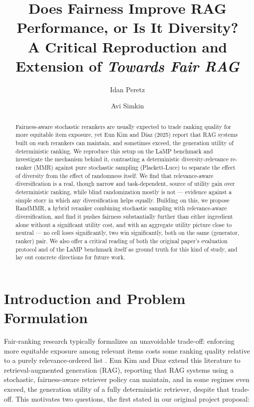 \documentclass[10pt,twocolumn]{article}
\title{\vspace{-1.2em}Does Fairness Improve RAG Performance, or Is It Diversity?\\
\large A Critical Reproduction and Extension of \emph{Towards Fair RAG}\vspace{-0.3em}}
\author[1]{Idan Peretz}
\author[1]{Avi Simkin}
\affil[1]{\normalsize \{308560150, 312485816\}}
\date{}
\begin{document}
\maketitle
\vspace{-2.2em}

\begin{abstract}
\noindent
Fairness-aware stochastic rerankers are usually expected to trade ranking quality for
more equitable item exposure, yet Eun Kim and Diaz (2025) report that RAG systems
built on such rerankers can maintain, and sometimes exceed, the generation utility of
deterministic ranking. We reproduce this setup on the LaMP benchmark and investigate
the mechanism behind it, contrasting a deterministic diversity-relevance re-ranker
(MMR) against pure stochastic sampling (Plackett-Luce) to separate the effect of
diversity from the effect of randomness itself. We find that relevance-aware
diversification is a real, though narrow and task-dependent, source of utility gain
over deterministic ranking, while blind randomization mostly is not --- evidence
against a simple story in which any diversification helps equally. Building on this,
we propose RandMMR, a hybrid reranker combining stochastic sampling with
relevance-aware diversification, and find it pushes fairness substantially further
than either ingredient alone without a significant utility cost, and with an
aggregate utility picture close to neutral --- no cell loses significantly, two
win significantly, both on the same (generator, ranker) pair. We also offer a
critical reading of
both the
original paper's evaluation protocol and of the LaMP benchmark itself as ground truth
for this kind of study, and lay out concrete directions for future work.
\end{abstract}

\vspace{0.3em}

\section{Introduction and Problem Formulation}
\label{sec:intro}

Fair-ranking research typically formalizes an unavoidable trade-off: enforcing more
equitable exposure among relevant items costs some ranking quality relative to a
purely relevance-ordered list \cite{castillo2018fairness,diaz2020evaluating}.
Eun Kim and Diaz \cite{eunkim2025fairrag} extend this literature to
retrieval-augmented generation (RAG), reporting that RAG systems using a stochastic,
fairness-aware retriever policy can maintain, and in some regimes even exceed, the
generation utility of a fully deterministic retriever, despite that trade-off. This
motivates two questions, the first stated in our original project proposal:
\end{document}
